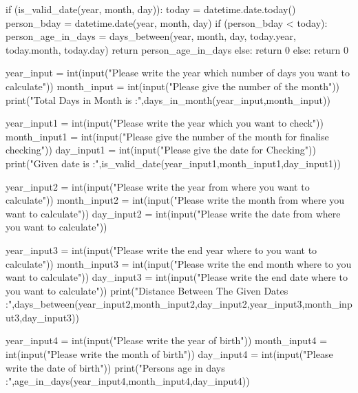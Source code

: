     if (is_valid_date(year, month, day)):
        today = datetime.date.today()
        person_bday = datetime.date(year, month, day)
        if (person_bday < today):
            person_age_in_days = days_between(year, month, day, today.year, today.month, today.day)
            return person_age_in_days
        else:
            return 0
    else:
        return 0

year_input = int(input("Please write the year which number of days you want to calculate"))
month_input = int(input("Please give the number of the month"))
print("Total Days in Month is :",days_in_month(year_input,month_input))

year_input1 = int(input("Please write the year which you want to check"))
month_input1 = int(input("Please give the number of the month for finalise checking"))
day_input1 = int(input("Please give the date for Checking"))
print("Given date is :",is_valid_date(year_input1,month_input1,day_input1))

year_input2 = int(input("Please write the year from where you want to calculate"))
month_input2 = int(input("Please write the month from where you want to calculate"))
day_input2 = int(input("Please write the date from where you want to calculate"))

year_input3 = int(input("Please write the end year where to you want to calculate"))
month_input3 = int(input("Please write the end month where to you want to calculate"))
day_input3 = int(input("Please write the end date where to you want to calculate"))
print("Distance Between The Given Dates :",days_between(year_input2,month_input2,day_input2,year_input3,month_input3,day_input3))

year_input4 = int(input("Please write the year of birth"))
month_input4 = int(input("Please write the month of birth"))
day_input4 = int(input("Please write the date of birth"))
print("Persons age in days  :",age_in_days(year_input4,month_input4,day_input4))
